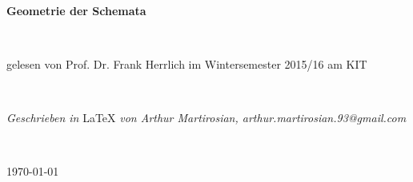\documentclass[11pt]{book}
\theoremstyle{nonumberbreak}
\begin{document}
\begin{titlepage}

\textrm{ }\\[64pt]

\begin{center}
{\fontsize{40}{40} \selectfont \textbf{Geometrie der Schemata}}
\end{center}
\textrm{ } \\[36pt]
\begin{center} \large{\textrm{gelesen von Prof. Dr. Frank Herrlich im Wintersemester 2015/16 am KIT}} \end{center}
\textrm{ } \\[320pt]
\begin{center} \large{\textit{Geschrieben in } \LaTeX \textit{ von Arthur Martirosian, arthur.martirosian.93@gmail.com}}\end{center}
\textrm{ }\\[24pt]
\begin{center} \large{\today} \end{center}

\end{titlepage}
\thispagestyle{empty}



\begin{spacing}{1.6}
\setcounter{tocdepth}{1}
\tableofcontents
\thispagestyle{empty}
\end{spacing}
\newpage
\end{document}

